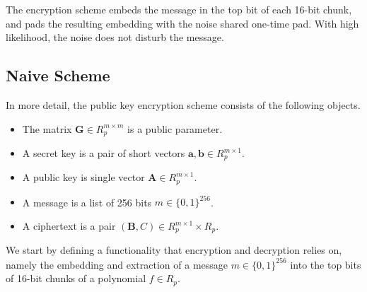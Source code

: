 The encryption scheme embeds the message in the top bit of each 16-bit chunk, and pads the resulting embedding with the noise shared one-time pad. With high likelihood, the noise does not disturb the message.

\subsection{Naive Scheme}

In more detail, the public key encryption scheme consists of the following objects.
\begin{itemize}
 \item The matrix $\mathbf{G} \in R_p^{m \times m}$ is a public parameter.
 \item A secret key is a pair of short vectors $\mathbf{a}, \mathbf{b} \in R_p^{m \times 1}$.
 \item A public key is single vector $\mathbf{A} \in R_p^{m \times 1}$.
 \item A message is a list of 256 bits $m \in \{0,1\}^{256}$.
 \item A ciphertext is a pair $(\mathbf{B}, C) \in R_p^{m \times 1} \times R_p$.
\end{itemize}

We start by defining a functionality that encryption and decryption relies on, namely the embedding and extraction of a message $m \in \{0,1\}^{256}$ into the top bits of 16-bit chunks of a polynomial $f \in R_p$.

\begin{algorithm}[!t] \label{algo:tb4-embed-msg}
\begin{scriptsize}
\caption{\emph{$\mathsf{embed\_msg}$}}
\end{scriptsize}
\end{algorithm} 
\begin{algorithm}[!t] \label{algo:tb4-extract-msg}
\begin{scriptsize}
\caption{\emph{$\mathsf{embed\_msg}$}}
\end{scriptsize}
\end{algorithm} 

